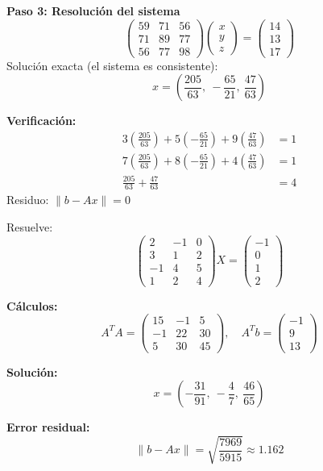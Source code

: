 \begin{example}
\begin{myproof}
\textbf{Paso 3: Resolución del sistema}
\[
\begin{pmatrix}
59 & 71 & 56 \\
71 & 89 & 77 \\
56 & 77 & 98
\end{pmatrix}
\begin{pmatrix} x \\ y \\ z \end{pmatrix}
= \begin{pmatrix} 14 \\ 13 \\ 17 \end{pmatrix}
\]
Solución exacta (el sistema es consistente):
\[
x = \left( \frac{205}{63},\ -\frac{65}{21},\ \frac{47}{63} \right)
\]

\textbf{Verificación:}
\begin{align*}
3\left(\frac{205}{63}\right) + 5\left(-\frac{65}{21}\right) + 9\left(\frac{47}{63}\right) &= 1 \\
7\left(\frac{205}{63}\right) + 8\left(-\frac{65}{21}\right) + 4\left(\frac{47}{63}\right) &= 1 \\
\frac{205}{63} + \frac{47}{63} &= 4
\end{align*}
Residuo: $\|b - Ax\| = 0$
\end{myproof}
\end{example}

\begin{example}
Resuelve:
\[
\begin{pmatrix}
2 & -1 & 0 \\
3 & 1 & 2 \\
-1 & 4 & 5 \\
1 & 2 & 4
\end{pmatrix}
X = 
\begin{pmatrix} -1 \\ 0 \\ 1 \\ 2 \end{pmatrix}
\]
\begin{myproof}
\textbf{Cálculos:}
\[
A^T A = \begin{pmatrix}
15 & -1 & 5 \\
-1 & 22 & 30 \\
5 & 30 & 45
\end{pmatrix}, \quad
A^T b = \begin{pmatrix} -1 \\ 9 \\ 13 \end{pmatrix}
\]

\textbf{Solución:}
\[
x = \left( -\dfrac{31}{91},\ -\dfrac{4}{7},\ \dfrac{46}{65} \right)
\]

\textbf{Error residual:}
\[
\|b - Ax\| = \sqrt{\frac{7969}{5915}} \approx 1.162
\]
\end{myproof}
\end{example}

